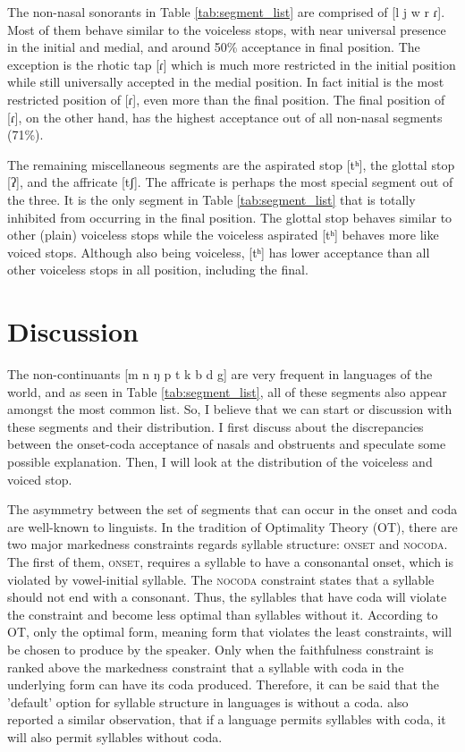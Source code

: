 \par
The non-nasal sonorants in Table \ref{tab:segment_list} are comprised of [l j w r ɾ]. 
Most of them behave similar to the voiceless stops, with near universal presence in the initial and medial, and around 50\% acceptance in final position. 
The exception is the rhotic tap [ɾ] which is much more restricted in the initial position while still universally accepted in the medial position. 
In fact initial is the most restricted position of [ɾ], even more than the final position. 
The final position of [ɾ], on the other hand, has the highest acceptance out of all non-nasal segments (71\%).

\par
The remaining miscellaneous segments are the aspirated stop [tʰ], the glottal stop [ʔ], and the affricate [tʃ]. 
The affricate is perhaps the most special segment out of the three. 
It is the only segment in Table \ref{tab:segment_list} that is totally inhibited from occurring in the final position. 
The glottal stop behaves similar to other (plain) voiceless stops while the voiceless aspirated [tʰ] behaves more like voiced stops.
Although also being voiceless, [tʰ] has lower acceptance than all other voiceless stops in all position, including the final.

\section{Discussion}

The non-continuants [m n ŋ p t k b d g] are very frequent in languages of the world, and as seen in Table \ref{tab:segment_list}, all of these segments also appear amongst the most common list.
So, I believe that we can start or discussion with these segments and their distribution.
I first discuss about the discrepancies between the onset-coda acceptance of nasals and obstruents and speculate some possible explanation.
Then, I will look at the distribution of the voiceless and voiced stop.

\par
The asymmetry between the set of segments that can occur in the onset and coda are well-known to linguists.
In the tradition of Optimality Theory (OT), there are two major markedness constraints regards syllable structure: \textsc{onset} and \textsc{nocoda}.
The first of them, \textsc{onset}, requires a syllable to have a consonantal onset, which is violated by vowel-initial syllable.
The \textsc{nocoda} constraint states that a syllable should not end with a consonant.
Thus, the syllables that have coda will violate the constraint and become less optimal than syllables without it.
According to OT, only the optimal form, meaning form that violates the least constraints, will be chosen to produce by the speaker.
Only when the faithfulness constraint is ranked above the markedness constraint that a syllable with coda in the underlying form can have its coda produced.
Therefore, it can be said that the 'default' option for syllable structure in languages is without a coda.
\citet{Gordon_2016} also reported a similar observation, that if a language permits syllables with coda, it will also permit syllables without coda.


